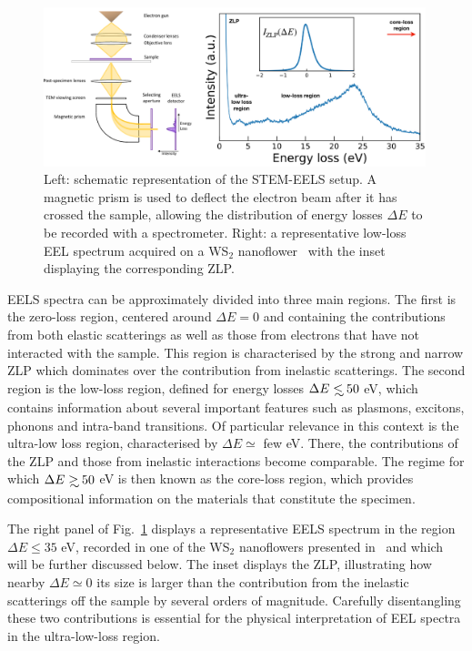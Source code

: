 \begin{figure}[t]
  \centering
  \includegraphics[width=0.99\textwidth]{plots/EELS.pdf}
  \caption{Left: schematic representation of the STEM-EELS setup.
    A magnetic
    prism is used to deflect the electron beam after it has crossed the sample,
   allowing the distribution of energy losses $\Delta E$ to be recorded
    with a spectrometer.
    Right: a representative low-loss EEL spectrum acquired 
    on a WS$_2$ nanoflower~\cite{SabryaWS2} with
    the inset displaying the corresponding ZLP.
  }
  \label{fig:EELS}
\end{figure}

EELS spectra can be approximately divided into three main regions.
%
The first is the zero-loss region, centered around $\Delta E=0$
and containing the contributions from both elastic scatterings
as well as those from electrons that have not interacted with the
sample.
%
This region is characterised by the strong and narrow ZLP
which dominates over the contribution
from inelastic scatterings.
%
The second region is the low-loss region, defined for energy losses
$\Delta E \lsim 50$ eV, which contains information
about several important features such as plasmons, excitons, phonons and
intra-band transitions.
%
Of particular relevance in this context is the ultra-low loss region, characterised by $\Delta E \simeq$ few eV.
%
There, the contributions of the ZLP and those from inelastic interactions
become comparable.
%
The regime for which $\Delta E \gsim 50$ eV is then known as the core-loss region,
which provides compositional information
on the materials that constitute the specimen.



The right panel of Fig.~\ref{fig:EELS} displays
a representative EELS spectrum in the region $\Delta E \le 35$ eV, recorded
in one of the WS$_2$ nanoflowers presented in~\cite{SabryaWS2}
and which will be further discussed below.
%
The inset displays the ZLP, illustrating how nearby $\Delta E\simeq 0$
its size is larger than the contribution from the inelastic scatterings
off the sample by several orders of magnitude.
%
Carefully disentangling these two contributions 
is essential for the physical interpretation of EEL spectra in the ultra-low-loss region.




